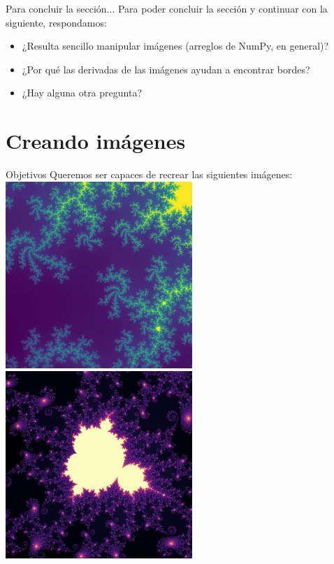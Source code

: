 \documentclass[usenames,dvipsnames]{beamer}
\begin{document}
  \begin{frame}{Para concluir la sección...}
    Para poder concluir la sección y continuar con la siguiente,
    respondamos:
    \begin{itemize}
      \item ¿Resulta sencillo manipular imágenes (arreglos de NumPy,
      en general)?
      \item ¿Por qué las derivadas de las imágenes ayudan a
      encontrar bordes?
      \item ¿Hay alguna otra pregunta?
    \end{itemize}
  \end{frame}

  \section{Creando imágenes}
  \begin{frame}{Objetivos}
    Queremos ser capaces de recrear las siguientes imágenes:\\
    \vspace*{0.3cm}
    \centering
    \hspace*{-0.35cm}
    \includegraphics[width=0.53\textwidth]{imgs/mandel}
    \includegraphics[width=0.53\textwidth]{../imgs/mandel}
  \end{frame}
\end{document}
